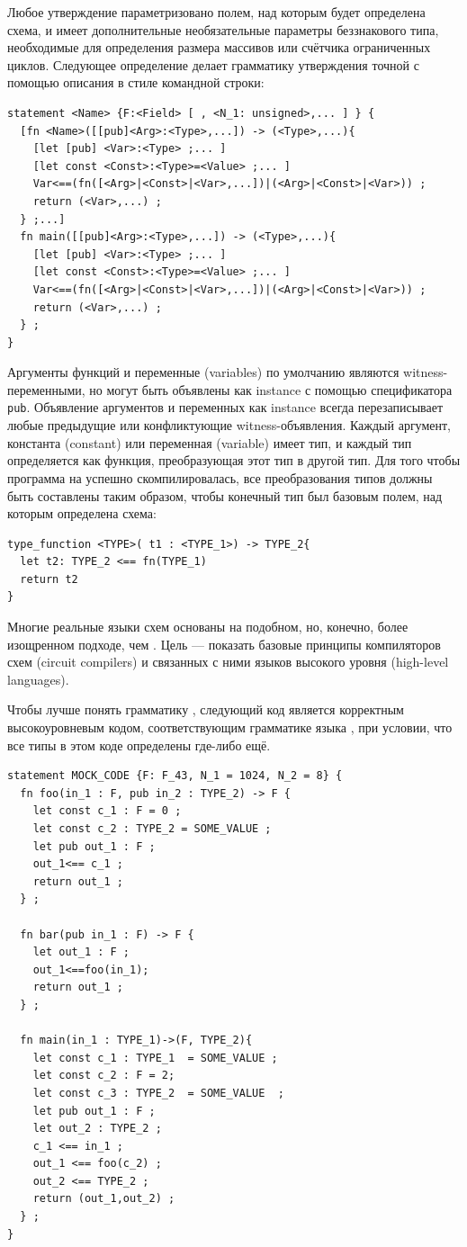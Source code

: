 Любое утверждение параметризовано полем, над которым будет определена схема, и имеет дополнительные необязательные параметры беззнакового типа, необходимые для определения размера массивов или счётчика ограниченных циклов. Следующее определение делает грамматику утверждения точной с помощью описания в стиле командной строки:
\begin{lstlisting}
statement <Name> {F:<Field> [ , <N_1: unsigned>,... ] } {
  [fn <Name>([[pub]<Arg>:<Type>,...]) -> (<Type>,...){
    [let [pub] <Var>:<Type> ;... ]
    [let const <Const>:<Type>=<Value> ;... ]
    Var<==(fn([<Arg>|<Const>|<Var>,...])|(<Arg>|<Const>|<Var>)) ;
    return (<Var>,...) ;
  } ;...]
  fn main([[pub]<Arg>:<Type>,...]) -> (<Type>,...){
    [let [pub] <Var>:<Type> ;... ]
    [let const <Const>:<Type>=<Value> ;... ]
    Var<==(fn([<Arg>|<Const>|<Var>,...])|(<Arg>|<Const>|<Var>)) ;
    return (<Var>,...) ;
  } ;
}
\end{lstlisting}
Аргументы функций и переменные (variables) по умолчанию являются witness-переменными, но могут быть объявлены как instance с помощью спецификатора \texttt{pub}. Объявление аргументов и переменных как instance всегда перезаписывает любые предыдущие или конфликтующие witness-объявления. Каждый аргумент, константа (constant) или переменная (variable) имеет тип, и каждый тип определяется как функция, преобразующая этот тип в другой тип. Для того чтобы программа на  успешно скомпилировалась, все преобразования типов должны быть составлены таким образом, чтобы конечный тип был базовым полем, над которым определена схема:
\begin{lstlisting}
type_function <TYPE>( t1 : <TYPE_1>) -> TYPE_2{
  let t2: TYPE_2 <== fn(TYPE_1)
  return t2
}
\end{lstlisting}
Многие реальные языки схем основаны на подобном, но, конечно, более изощренном подходе, чем . Цель  --- показать базовые принципы компиляторов схем (circuit compilers) и связанных с ними языков высокого уровня (high-level languages).
\begin{example}Чтобы лучше понять грамматику , следующий код является корректным высокоуровневым кодом, соответствующим грамматике языка , при условии, что все типы в этом коде определены где-либо ещё.
\begin{lstlisting}
statement MOCK_CODE {F: F_43, N_1 = 1024, N_2 = 8} {
  fn foo(in_1 : F, pub in_2 : TYPE_2) -> F {
    let const c_1 : F = 0 ;
    let const c_2 : TYPE_2 = SOME_VALUE ;
    let pub out_1 : F ;
    out_1<== c_1 ;
    return out_1 ;
  } ;
  
  fn bar(pub in_1 : F) -> F {
    let out_1 : F ;
    out_1<==foo(in_1);
    return out_1 ;
  } ;
    
  fn main(in_1 : TYPE_1)->(F, TYPE_2){
    let const c_1 : TYPE_1  = SOME_VALUE ;
    let const c_2 : F = 2;
    let const c_3 : TYPE_2  = SOME_VALUE  ;
    let pub out_1 : F ;
    let out_2 : TYPE_2 ;
    c_1 <== in_1 ;
    out_1 <== foo(c_2) ;
    out_2 <== TYPE_2 ;
    return (out_1,out_2) ;
  } ;
}
\end{lstlisting}
\end{example}
